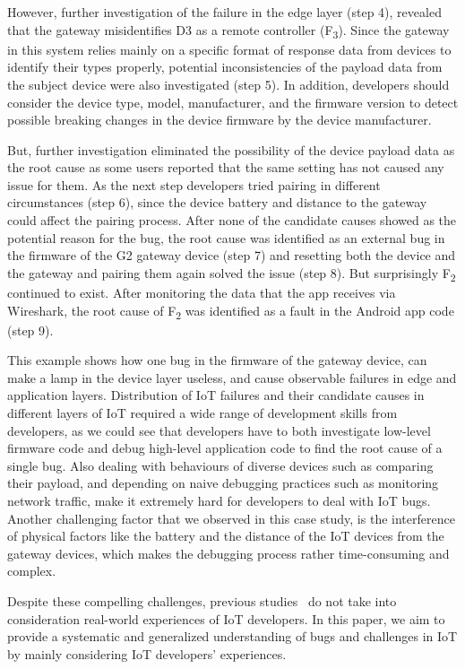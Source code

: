 However, further investigation of the failure in the edge layer (step 4), revealed that the gateway misidentifies D3 as a remote controller (F\textsubscript{3}). Since the gateway in this system relies mainly on a specific format of response data from devices to identify their types properly, potential inconsistencies of the payload data from the subject device were also investigated (step 5). In addition, developers should consider the device type, model, manufacturer, and the firmware version to detect possible breaking changes in the device firmware by the device manufacturer. 

But, further investigation eliminated the possibility of the device payload data as the root cause as some users reported that the same setting has not caused any issue for them. As the next step developers tried pairing in different circumstances (step 6), since the device battery and distance to the gateway could affect the pairing process. After none of the candidate causes showed as the potential reason for the bug, the root cause was identified as an external bug in the firmware of the G2 gateway device (step 7) and resetting both the device and the gateway and pairing them again solved the issue (step 8). But surprisingly F\textsubscript{2} continued to exist. After monitoring the data that the app receives via Wireshark, the root cause of F\textsubscript{2} was identified as a fault in the Android app code (step 9).

This example shows how one bug in the firmware of the gateway device, can make a lamp in the device layer useless, and cause observable failures in edge and application layers. Distribution of IoT failures and their candidate causes in different layers of IoT required a wide range of development skills from developers, as we could see that developers have to both investigate low-level firmware code and debug high-level application code to find the root cause of a single bug. Also dealing with behaviours of diverse devices such as comparing their payload, and depending on naive debugging practices such as monitoring network traffic, make it extremely hard for developers to deal with IoT bugs. Another challenging factor that we observed in this case study, is the interference of physical factors like the battery and the distance of the IoT devices from the gateway devices, which makes the debugging process rather time-consuming and complex.

Despite these compelling challenges, previous studies~\cite{hnat2011hitchhiker,corno2019challenges,stojkoska2017review,chen2017application,IoTOSBugs} do not take into consideration real-world experiences of IoT developers. In this paper, we aim to provide a systematic and generalized understanding of bugs and challenges in IoT by mainly considering IoT developers' experiences.

\endinput

